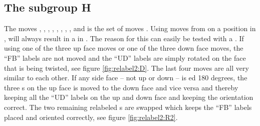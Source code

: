 \subsection{The subgroup H}
\label{sub:theSubgroupH}
The moves , , , , , , , ,  and  is the set of moves . Using moves from  on a position in , will always result in a \rubik{} in . The reason for this can easily be tested with a \rubik{}. If using one of the three up face moves or one of the three down face moves, the ``FB'' labels are not moved and the ``UD'' labels are simply rotated on the face that is being twisted, see figure \ref{fig:relabel2:D}. The last four moves are all very similar to each other. If any side face -- not up or down -- is \twist{}ed 180 degrees, the three \facelet{}s on the up face is moved to the down face and vice versa and thereby keeping all the ``UD'' labels on the up and down face and keeping the orientation correct. The two remaining relabeled \facelet{}s are swapped which keeps the ``FB'' labels placed and oriented correctly, see figure \ref{fig:relabel2:R2}.


\begin{figure}[!hbt]
	\centering
	\hspace{0.05\textwidth}
	\caption{}
	\label{fig:relabel2}
\end{figure}

